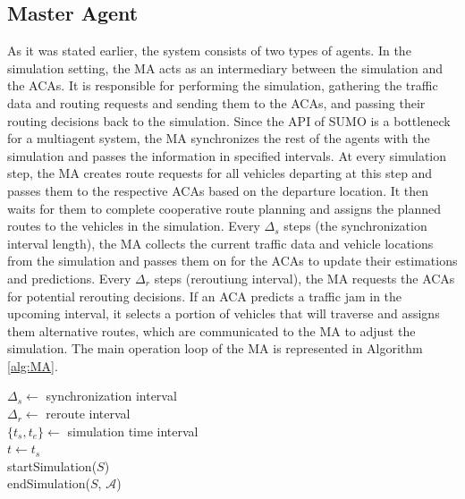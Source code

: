 \documentclass[sigconf]{aamas}
\begin{document}
\subsection{Master Agent}
As it was stated earlier, the system consists of two types of agents. In the simulation setting, the MA acts as an intermediary between the simulation and the ACAs. It is responsible for performing the simulation, gathering the traffic data and routing requests and sending them to the ACAs, and passing their routing decisions back to the simulation. Since the API of SUMO is a bottleneck for a multiagent system, the MA synchronizes the rest of the agents with the simulation and passes the information in specified intervals. At every simulation step, the MA creates route requests for all vehicles departing at this step and passes them to the respective ACAs based on the departure location. It then waits for them to complete cooperative route planning and assigns the planned routes to the vehicles in the simulation. Every $\Delta_s$ steps (the synchronization interval length), the MA collects the current traffic data and vehicle locations from the simulation and passes them on for the ACAs to update their estimations and predictions. Every $\Delta_r$ steps (reroutiung interval), the MA requests the ACAs for potential rerouting decisions. If an ACA predicts a traffic jam in the upcoming interval, it selects a portion of vehicles that will traverse and assigns them alternative routes, which are communicated to the MA to adjust the simulation. The main operation loop of the MA is represented in Algorithm \ref{alg:MA}.

\begin{algorithm}
    \caption{Master Agent Process}
    \label{alg:MA}
    $\Delta_s \gets$ synchronization interval\\
    $\Delta_r \gets$ reroute interval \\
    $\{t_s, t_e\} \gets$ simulation time interval\\
    $t \gets t_s$\\
    startSimulation($S$)\\
    endSimulation($S$, $\mathcal{A}$)\\
\end{algorithm}
\end{document}
